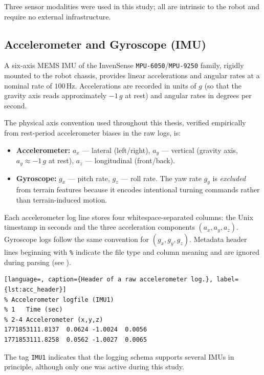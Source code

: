 Three sensor modalities were used in this study; all are intrinsic to the
robot and require no external infrastructure.

\subsection{Accelerometer and Gyroscope (IMU)}

A six-axis MEMS IMU of the InvenSense \texttt{MPU-6050}/\texttt{MPU-9250}
family, rigidly mounted to the robot chassis, provides linear accelerations
and angular rates at a nominal rate of $100\,\text{Hz}$.
Accelerations are recorded in units of $g$ (so that the gravity axis reads
approximately $-1\,g$ at rest) and angular rates in degrees per second.

The physical axis convention used throughout this thesis, verified
empirically from rest-period accelerometer biases in the raw logs, is:
\begin{itemize}
    \item \textbf{Accelerometer:} $a_x$ — lateral (left/right),
          $a_y$ — vertical (gravity axis, $a_y \approx -1\,g$ at rest),
          $a_z$ — longitudinal (front/back).
    \item \textbf{Gyroscope:} $g_x$ — pitch rate, $g_z$ — roll rate.
          The yaw rate $g_y$ is \emph{excluded} from terrain features
          because it encodes intentional turning commands rather than
          terrain-induced motion.
\end{itemize}

Each accelerometer log line stores four whitespace-separated columns:
the Unix timestamp in seconds and the three acceleration components
$(a_x,a_y,a_z)$.
Gyroscope logs follow the same convention for $(g_x,g_y,g_z)$.
Metadata header lines beginning with \texttt{\%} indicate the file type
and column meaning and are ignored during parsing
(see ).

\begin{lstlisting}[language=, caption={Header of a raw accelerometer log.}, label={lst:acc_header}]
% Accelerometer logfile (IMU1)
% 1   Time (sec)
% 2-4 Accelerometer (x,y,z)
1771853111.8137  0.0624 -1.0024  0.0056
1771853111.8258  0.0562 -1.0027  0.0065
\end{lstlisting}

The tag \texttt{IMU1} indicates that the logging schema supports several
IMUs in principle, although only one was active during this study.

